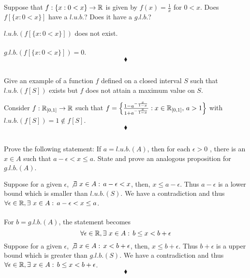\subsection{}
\begin{tcolorbox}
Suppose that $f: \{x :0 < x\}\rightarrow\mathbb{R}$ is given by $f (x)= \frac{1}{x}$  for $0 < x$. Does $f [\{x : 0 < x\}]$ have a $l.u.b.$? Does it have a $g.l.b.$? 
\end{tcolorbox}
$$ $$ 
$l.u.b. (f [\{x : 0 < x\}])$ does not exist.\\\\
$g.l.b. (f [\{x : 0 < x\}])=0$.
$$\blacklozenge$$

\subsection{}
\begin{tcolorbox}
Give an example of a function $f$ defined on a closed interval $S$ such that $l.u.b. (f [S])$ exists but $f$ does not attain a maximum value on $S$.
\end{tcolorbox}
Consider $f:\mathbb{R}_{[0,1]}\rightarrow \mathbb{R}$ such that $f=\left\{\frac{1-a^{-\frac{x}{1-x}}}{1+a^{-\frac{x}{1-x}}}:x\in \mathbb{R}_{[0,1]},\, a>1 \right\}$ with $l.u.b. (f [S])=1\not\in f [S]$.
$$\blacklozenge$$

\subsection{}
\begin{tcolorbox}
Prove the following statement: If $a = l.u.b. (A)$, then for each $\epsilon > 0$ , there is an $x \in  A$ such that $a-\epsilon < x \leq a$. State and prove an analogous proposition for $g.l.b. (A)$. 
\end{tcolorbox}
Suppose for a given $\epsilon$,  $\not\exists\,\, x\in A:\, a-\epsilon < x$, then, $x\leq a-\epsilon$. Thus $a-\epsilon$ is a lower bound which is smaller than $l.u.b.(S)$. We have a contradiction and thus $\forall\epsilon\in\mathbb{R}, \exists\,\, x\in A:\, a-\epsilon < x \leq a$.\\\\
For $b= g.l.b. (A)$, the statement becomes $$\forall\epsilon\in\mathbb{R}, \exists\,\, x\in A:\, b\leq  x < b+\epsilon$$
Suppose for a given $\epsilon$,  $\not\exists\,\, x\in A:\, x < b+\epsilon$, then, $x \leq b+\epsilon$. Thus $b+\epsilon$ is a upper bound which is greater than $g.l.b.(S)$. We have a contradiction and thus $\forall\epsilon\in\mathbb{R}, \exists\,\, x\in A:\, b\leq  x < b+\epsilon$.
$$\blacklozenge$$

